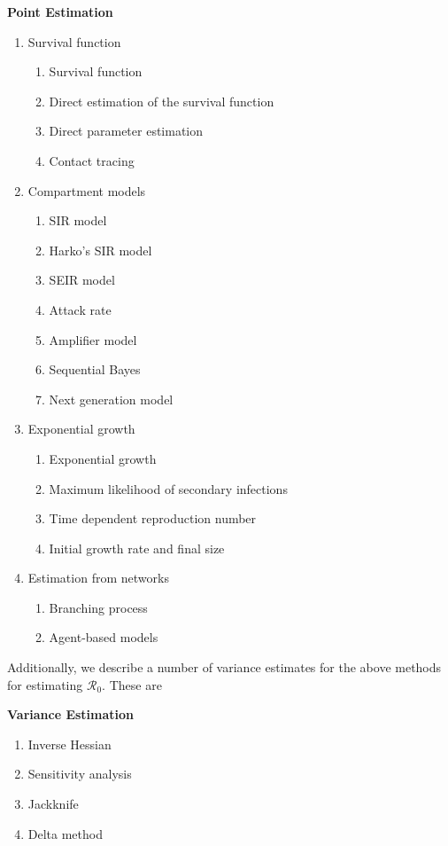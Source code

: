 \documentclass[12pt]{article}
\newcommand{\rr}{\ensuremath{\mathcal{R}_0}}
\begin{document}
\textbf{Point Estimation}
\begin{enumerate}
\item Survival function
  \begin{enumerate}
  \item Survival function
  \item Direct estimation of the survival function
  \item Direct parameter estimation
  \item Contact tracing
  \end{enumerate}
\item Compartment models
  \begin{enumerate}
  \item SIR model
  \item Harko's SIR model
  \item SEIR model
  \item Attack rate
  \item Amplifier model
  \item Sequential Bayes
  \item Next generation model
  \end{enumerate}
\item Exponential growth
  \begin{enumerate}
  \item Exponential growth
  \item Maximum likelihood of secondary infections
  \item Time dependent reproduction number
  \item Initial growth rate and final size
  \end{enumerate}
\item Estimation from networks
  \begin{enumerate}
  \item Branching process
  \item Agent-based models
  \end{enumerate}
  \end{enumerate}

  Additionally, we describe a number of variance estimates for the above methods for estimating \rr.  These are
  
\textbf{Variance Estimation}
  \begin{enumerate}
  \item Inverse Hessian
  \item Sensitivity analysis
  \item Jackknife
  \item Delta method
  \end{enumerate}
\end{document}
